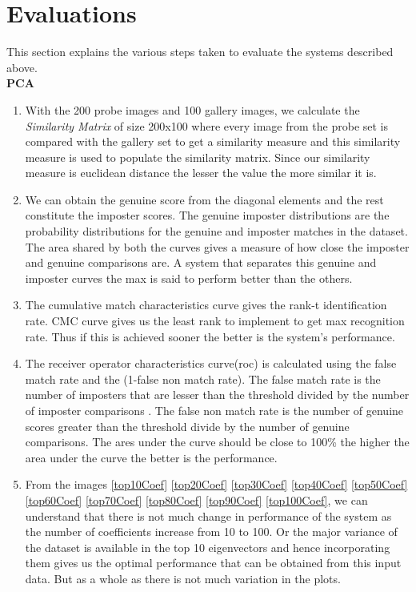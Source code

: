 \documentclass[conference]{IEEEtran}
\begin{document}
\section{Evaluations}
This section explains the various steps taken to evaluate the systems described above. \\
\textbf{PCA}
\begin{enumerate}
\item With the 200 probe images and 100 gallery images, we calculate the {\sl Similarity Matrix} of size 200x100 where every image from the probe set is compared with the gallery set to get a similarity measure and this similarity measure is used to populate the similarity matrix. Since our similarity measure is euclidean distance the lesser the value the more similar it is. 
\item We can obtain the genuine score from the diagonal elements and the rest constitute the imposter scores. The genuine imposter distributions are the probability distributions for the genuine and imposter matches in the dataset. The area shared by both the curves gives a measure of how close the imposter and genuine comparisons are. A system that separates this genuine and imposter curves the max is said to perform better than the others.
\item The cumulative match characteristics curve gives the rank-t identification rate. CMC curve gives us the least rank to implement to get max recognition rate. Thus if this is achieved sooner the better is the system's performance. 
\item The receiver operator characteristics curve(roc) is calculated using the false match rate and the (1-false non match rate). The false match rate is the number of imposters that are lesser than the threshold divided by the number of imposter comparisons . The false non match rate is the number of genuine scores greater than the threshold divide by the number of genuine comparisons. The ares under the curve should be close to 100\% the higher the area under the curve the better is the performance.
\item From the images \ref{top10Coef} \ref{top20Coef} \ref{top30Coef} \ref{top40Coef} \ref{top50Coef} \ref{top60Coef} \ref{top70Coef} \ref{top80Coef} \ref{top90Coef} \ref{top100Coef}, we can understand that there is not much change in performance of the system as the number of coefficients increase from 10 to 100. Or the major variance of the dataset is available in the top 10 eigenvectors and hence incorporating them gives us the optimal performance that can be obtained from this input data. But as a whole as there is not much variation in the plots.


\end{enumerate}
\end{document}
